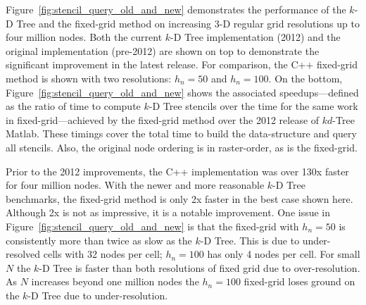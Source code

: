\documentclass{report}
\begin{document}
Figure~\ref{fig:stencil_query_old_and_new} demonstrates the performance of the $k$-D Tree and the fixed-grid method on increasing 3-D regular grid resolutions up to four million nodes. Both the current $k$-D Tree implementation (2012) and the original implementation (pre-2012) are shown on top to demonstrate the significant improvement in the latest release. For comparison, the C++ fixed-grid method is shown with two resolutions: $h_n = 50$ and $h_n=100$. On the bottom, Figure~\ref{fig:stencil_query_old_and_new} shows the associated speedups---defined as the ratio of time to compute $k$-D Tree stencils over the time for the same work in fixed-grid---achieved by the fixed-grid method over the 2012 release of $kd$-Tree Matlab. These timings cover the total time to build the data-structure and query all stencils. Also, the original node ordering is in raster-order, as is the fixed-grid. 


Prior to the 2012 improvements, the C++ implementation was over 130x faster for four million nodes. With the newer and more reasonable $k$-D Tree benchmarks, the fixed-grid method is only 2x faster in the best case shown here. Although 2x is not as impressive, it is a notable improvement. One issue in Figure~\ref{fig:stencil_query_old_and_new} is that the fixed-grid with $h_n=50$ is consistently more than twice as slow as the $k$-D Tree. This is due to under-resolved cells with 32 nodes per cell; $h_n=100$ has only 4 nodes per cell. For small $N$ the $k$-D Tree is faster than both resolutions of fixed grid due to over-resolution. As $N$ increases beyond one million nodes the $h_n=100$ fixed-grid loses ground on the $k$-D Tree due to under-resolution. 
\end{document}
